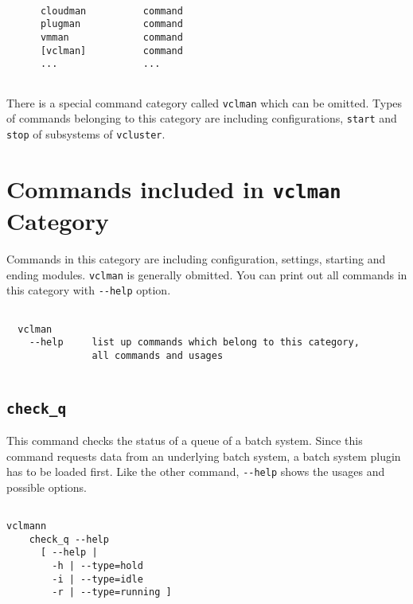 \documentclass[11pt]{article}
\def \ttt{\texttt}
\def \vb{\verb}
\begin{document}
\begin{Verbatim}[fontfamily=courier, fontsize = \small, obeytabs
=true, tabsize=4, frame=lines]

      cloudman          command
      plugman           command
      vmman             command
      [vclman]          command
      ...               ...
  
\end{Verbatim}

There is a special command category called \vb+vclman+ which can be omitted. Types of commands belonging to this category are including configurations, \vb+start+ and \vb+stop+ of subsystems of \vb+vcluster+.

\newpage

\section{Commands included in \ttt{vclman} Category}

Commands in this category are including configuration, settings, starting and ending modules. \vb+vclman+ is generally obmitted. You can print out all commands in this category with \vb+--help+ option. 


\begin{Verbatim}[fontfamily=courier, fontsize = \small, obeytabs
=true, tabsize=4, frame=lines]

  vclman 
    --help     list up commands which belong to this category, 
               all commands and usages
  
\end{Verbatim}


\subsection{\ttt{check\_q}}
This command checks the status of a queue of a batch system. Since this command requests data from an underlying batch system, a batch system plugin has to be loaded first. Like the other command, \vb+--help+ shows the usages and possible options.

\begin{Verbatim}[fontfamily=courier, fontsize = \small, obeytabs
=true, tabsize=4, frame=lines]

vclmann 
    check_q --help
      [ --help |
        -h | --type=hold
        -i | --type=idle
        -r | --type=running ] 
      
\end{Verbatim}
\end{document}
